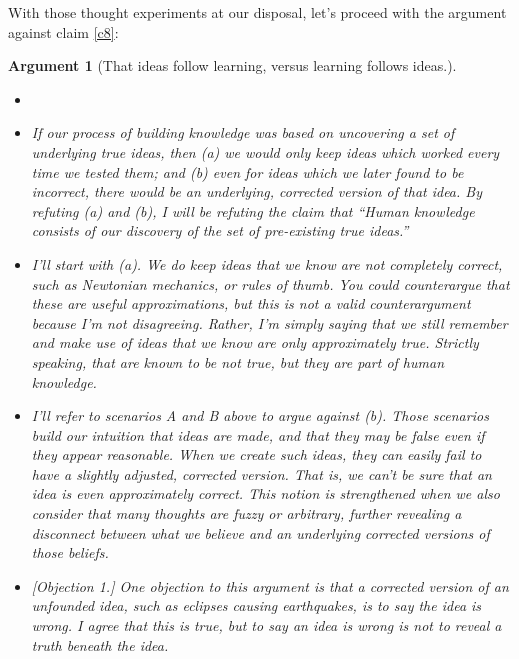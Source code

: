 \documentclass[11pt, oneside]{article}   	%
\newtheorem{argt}{Argument}
\begin{document}
With those thought experiments at our disposal, let's proceed with
the argument against claim \ref{c8}:
\begin{argt}[That ideas follow learning, versus learning follows ideas.]
    \label{a6}
    \normalfont
\begin{itemize}
    \item[]

    \item{} If our process of building knowledge was based on uncovering a set
        of underlying true ideas, then (a) we would only keep ideas which worked
        every time we tested them; and (b) even for ideas which we later found
        to be incorrect, there would be an underlying, corrected version of that
        idea. By refuting (a) and (b), I will be refuting the claim that ``Human
        knowledge consists of our discovery of the set of pre-existing true
        ideas.''

    \item{} I'll start with (a). We do keep ideas that we know are not
        completely correct, such as Newtonian mechanics, or rules of thumb.
        You could counterargue that these are useful approximations, but this is
        not a valid counterargument because I'm not disagreeing.
        Rather, I'm simply saying that we still remember and make use of ideas
        that we know are only approximately true. Strictly speaking, that are
        known to be not true, but they are part of human knowledge.

    \item{} I'll refer to scenarios A and B above to argue against (b).
        Those scenarios build our intuition that ideas are {\em made}, and that
        they may be false even if they appear reasonable. When we create such
        ideas, they can easily fail to have a slightly adjusted, corrected
        version. That is, we can't be sure that an idea is
        even approximately correct. This notion is strengthened when we
        also consider that many thoughts are fuzzy or arbitrary, further
        revealing a disconnect between what we believe and an underlying
        corrected versions of those beliefs.

    \item{} [Objection 1.] One objection to this argument is that a corrected
        version of an unfounded idea, such as eclipses causing earthquakes, is
        to say the idea is wrong. I agree that this is true, but to say an idea
        is wrong is not to reveal a truth beneath the idea.


\end{itemize}
\end{argt}
\end{document}
